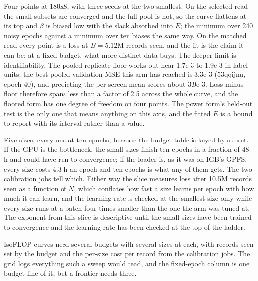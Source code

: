 Four points at 180x8, with three seeds at the two smallest. On the selected read
the small subsets are converged and the full pool is not, so the curve flattens
at its top and $\beta$ is biased low with the slack absorbed into $E$; the
minimum over 240 noisy epochs against a minimum over ten biases the same way. On
the matched read every point is a loss at $B = 5.12$M records seen, and the fit is
the claim it can be: at a fixed budget, what more distinct data buys. The deeper
limit is identifiability. The pooled replicate floor works out near 1.7e-3 to
1.9e-3 in label units; the best pooled validation MSE this arm has reached is
3.3e-3 (53qqijnu, epoch 40), and predicting the per-screen mean scores about
3.9e-3. Loss minus floor therefore spans less than a factor of 2.5 across the
whole curve, and the floored form has one degree of freedom on four points. The
power form's held-out test is the only one that means anything on this axis, and
the fitted $E$ is a bound to report with its interval rather than a value.

Five sizes, every one at ten epochs, because the budget table is keyed by subset.
If the GPU is the bottleneck, the small sizes finish ten epochs in a fraction of
48 h and could have run to convergence; if the loader is, as it was on IGB's
GPFS, every size costs 4.3 h an epoch and ten epochs is what any of them gets.
The two calibration jobs tell which. Either way the slice measures loss after
10.5M records seen as a function of $N$, which conflates how fast a size learns
per epoch with how much it can learn, and the learning rate is checked at the
smallest size only while every size runs at a batch four times smaller than the
one the arm was tuned at. The exponent from this slice is descriptive until the
small sizes have been trained to convergence and the learning rate has been
checked at the top of the ladder.

IsoFLOP curves need several budgets with several sizes at each, with records
seen set by the budget and the per-size cost per record from the calibration
jobs. The grid logs everything such a sweep would read, and the fixed-epoch
column is one budget line of it, but a frontier needs three.
